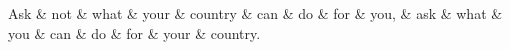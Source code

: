 \begin{dependency}[theme = simple, group style =macutek]
\begin{deptext}[column sep = .5cm]
Ask \& not \& what \& your \& country \& can \& do \& for \& you, \& ask \& what \& you \& can \& do \& for \& your \& country. \\
\end{deptext}
\end{dependency}